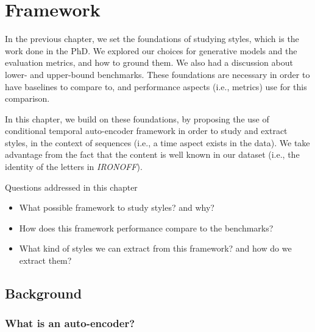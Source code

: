 \chapter{Framework} \label{ch:framework}
\minitoc%

\par In the previous chapter, we set the foundations of studying styles, which is the work done in the PhD. We explored our choices for generative models and the evaluation metrics, and how to ground them. We also had a discussion about lower- and upper-bound benchmarks. These foundations are necessary in order to have baselines to compare to, and performance aspects (i.e., metrics) use for this comparison. %

\par In this chapter, we build on these foundations, by proposing the use of conditional temporal auto-encoder framework in order to study and extract styles, in the context of sequences (i.e., a time aspect exists in the data). We take advantage from the fact that the content is well known in our dataset (i.e., the identity of the letters in \textit{IRONOFF}).

\begin{mdframed}[backgroundcolor=blue!20]
    \begin{center}
        Questions addressed in this chapter
    \end{center}

    \begin{itemize}
        \item What possible framework to study styles? and why?
        \item How does this framework performance compare to the benchmarks?
        \item What kind of styles we can extract from this framework? and how do we extract them?
    \end{itemize}
\end{mdframed}

\clearpage

\section{Background}
  \subsection{What is an auto-encoder?}\label{sec:autoencoder}

